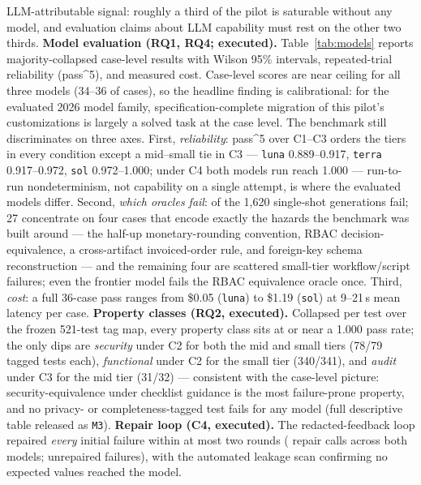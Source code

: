 \documentclass{ieeetj}
\begin{document}
LLM-attributable signal: roughly a third of the pilot is saturable without any model, and
evaluation claims about LLM capability must rest on the other two thirds.
\textbf{Model evaluation (RQ1, RQ4; executed).} Table~\ref{tab:models} reports
majority-collapsed case-level results with Wilson 95\% intervals, repeated-trial reliability
(pass\textasciicircum{}5), and measured cost. Case-level scores are near ceiling for all
three models (34--36 of \NumCases{} cases), so the headline finding is calibrational: for
the evaluated 2026 model family, specification-complete migration of this pilot's
customizations is largely a solved task at the case level. The benchmark still discriminates on three axes.
First, \emph{reliability}: pass\textasciicircum{}5 over C1--C3 orders the tiers in every
condition except a mid--small tie in C3 --- \texttt{luna} 0.889--0.917, \texttt{terra}
0.917--0.972, \texttt{sol} 0.972--1.000; under C4 both models run reach 1.000 ---
run-to-run nondeterminism, not capability on a single attempt, is where the evaluated
models differ. Second, \emph{which oracles fail}: \PTwoFails{} of the 1{,}620 single-shot
generations fail; 27 concentrate on four cases that encode exactly the hazards the benchmark
was built around --- the half-up monetary-rounding convention, RBAC decision-equivalence, a
cross-artifact invoiced-order rule, and foreign-key schema reconstruction --- and the
remaining four are scattered small-tier workflow/script failures; even the frontier model
fails the RBAC equivalence oracle once. Third, \emph{cost}: a full 36-case pass ranges
from \$0.05 (\texttt{luna}) to \$1.19 (\texttt{sol}) at 9--21\,s mean latency per case.
\textbf{Property classes (RQ2, executed).} Collapsed per test over the frozen 521-test tag
map, every property class sits at or near a 1.000 pass rate; the only dips are
\emph{security} under C2 for both the mid and small tiers (78/79 tagged tests each),
\emph{functional} under C2 for the small tier (340/341), and \emph{audit} under C3 for the
mid tier (31/32) --- consistent with the case-level picture: security-equivalence under
checklist guidance is the most failure-prone property, and no privacy- or
completeness-tagged test fails for any model (full descriptive table released as
\texttt{M3}).
\textbf{Repair loop (C4, executed).} The redacted-feedback loop repaired \emph{every}
initial failure within at most two rounds (\RepairCalls{} repair calls across both models;
\RepairUnfixed{} unrepaired failures), with the automated leakage scan confirming no
expected values reached the model.
\end{document}
